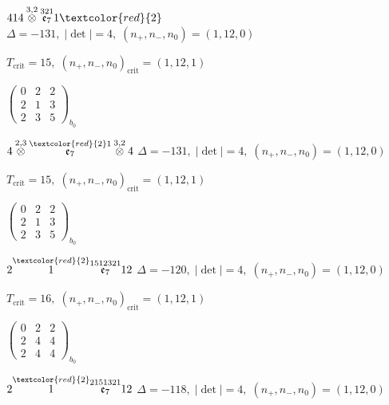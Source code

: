 \documentclass[10pt]{article}
\begin{document}
\smallskip

$414\overset{3,2}{\otimes}\overset{321}{\mathfrak{e}_7}1\textcolor{red}{2}$ \quad $\Delta=-131,\; |\det|=4,\; (n_+,n_-,n_0)=(1,12,0)$

\hspace{1em}$T_{\text{crit}}=15,\; (n_+,n_-,n_0)_{\text{crit}}=(1,12,1)$

\hspace{2em}$\left(\begin{smallmatrix}0 & 2 & 2 \\ 2 & 1 & 3 \\ 2 & 3 & 5\end{smallmatrix}\right)_{\!b_0}$

\smallskip

$4\overset{2,3}{\otimes}\overset{\textcolor{red}{2}1}{\mathfrak{e}_7}\overset{3,2}{\otimes}4$ \quad $\Delta=-131,\; |\det|=4,\; (n_+,n_-,n_0)=(1,12,0)$

\hspace{1em}$T_{\text{crit}}=15,\; (n_+,n_-,n_0)_{\text{crit}}=(1,12,1)$

\hspace{2em}$\left(\begin{smallmatrix}0 & 2 & 2 \\ 2 & 1 & 3 \\ 2 & 3 & 5\end{smallmatrix}\right)_{\!b_0}$

\smallskip

$2\overset{\textcolor{red}{2}}{1}\overset{1512321}{\mathfrak{e}_7}12$ \quad $\Delta=-120,\; |\det|=4,\; (n_+,n_-,n_0)=(1,12,0)$

\hspace{1em}$T_{\text{crit}}=16,\; (n_+,n_-,n_0)_{\text{crit}}=(1,12,1)$

\hspace{2em}$\left(\begin{smallmatrix}0 & 2 & 2 \\ 2 & 4 & 4 \\ 2 & 4 & 4\end{smallmatrix}\right)_{\!b_0}$

\smallskip

$2\overset{\textcolor{red}{2}}{1}\overset{2151321}{\mathfrak{e}_7}12$ \quad $\Delta=-118,\; |\det|=4,\; (n_+,n_-,n_0)=(1,12,0)$
\end{document}
